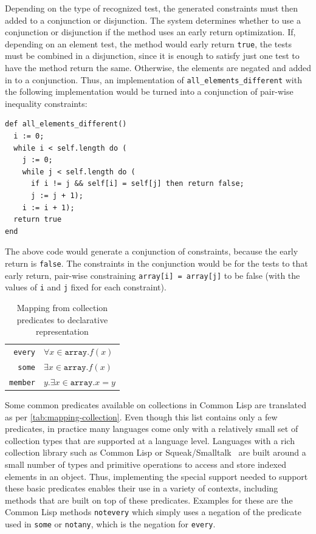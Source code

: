 Depending on the type of recognized test, the generated constraints
must then added to a conjunction or disjunction. The system determines
whether to use a conjunction or disjunction if the method uses an
early return optimization. If, depending on an element test, the
method would early return \verb!true!, the tests must be combined in a
disjunction, since it is enough to satisfy just one test to have the
method return the same. Otherwise, the elements are negated and added
in to a conjunction.  Thus, an implementation of
\verb!all_elements_different!  with the following implementation would
be turned into a conjunction of pair-wise inequality constraints:
\begin{lstlisting}
def all_elements_different()
  i := 0;
  while i < self.length do (
    j := 0;
    while j < self.length do (
      if i != j && self[i] = self[j] then return false;
      j := j + 1);
    i := i + 1);
  return true
end
\end{lstlisting}
The above code would generate a conjunction of constraints, because
the early return is \verb!false!. The constraints in the conjunction
would be for the tests to that early return, pair-wise constraining
\verb!array[i] = array[j]! to be false (with the values of \verb!i!
and \verb!j! fixed for each constraint).

\begin{table}
  \caption{Mapping from collection predicates to declarative representation}
  \label{tab:mapping-collection}
  \centering
  \begin{tabular}{r|l}
    \verb!every! & $\forall x\in \texttt{array}. f(x)$\\
    \verb!some! & $\exists x\in \texttt{array}. f(x)$\\
    \verb!member! & $y. \exists x\in \texttt{array}. x = y$\\
  \end{tabular}
\end{table}

Some common predicates available on collections in Common Lisp are
translated as per \autoref{tab:mapping-collection}. %
Even though this list contains only a few predicates, in practice many
languages come only with a relatively small set of collection types
that are supported at a language level. Languages with a rich
collection library such as Common Lisp or Squeak/Smalltalk~\cite{Ingalls1997Squeak} are built around a small number of types and
primitive operations to access and store indexed elements in an
object. Thus, implementing the special support needed to support these
basic predicates enables their use in a variety of contexts, including
methods that are built on top of these predicates. Examples for these
are the Common Lisp methods \verb!notevery! which simply uses a
negation of the predicate used in \verb!some! or \verb!notany!, which
is the negation for \verb!every!.

